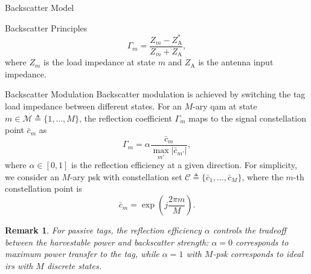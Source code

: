 \documentclass[journal]{IEEEtran}
\newtheorem{remark}{Remark}
\begin{document}
\begin{section}{Backscatter Model}
\begin{subsection}{Backscatter Principles}
			\begin{equation}
				\Gamma_m = \frac{Z_m - Z_{\mathrm{A}}^*}{Z_m + Z_{\mathrm{A}}},
				\label{eq:reflection_coefficient}
			\end{equation}
			where $Z_m$ is the load impedance at state $m$ and $Z_{\mathrm{A}}$ is the antenna input impedance.
		\end{subsection}

		\begin{subsection}{Backscatter Modulation}
			Backscatter modulation is achieved by switching the tag load impedance between different states. For an $M$-ary \gls{qam} at state $m \in \mathcal{M} \triangleq \{1,\ldots,M\}$, the reflection coefficient $\Gamma_m$ maps to the signal constellation point $\bar{c}_m$ as \cite{Thomas2012a}
			\begin{equation}
				\Gamma_m = \alpha \frac{\bar{c}_m}{\max_{m'} \lvert \bar{c}_{m'} \rvert},
				\label{eq:backscatter_modulation}
			\end{equation}
			where $\alpha \in [0,1]$ is the reflection efficiency at a given direction. For simplicity, we consider an $M$-ary \gls{psk} with constellation set $\mathcal{C} \triangleq \{\bar{c}_1,\ldots,\bar{c}_M\}$, where the $m$-th constellation point is
			\begin{equation}
				\bar{c}_m = \exp \left(j \frac{2 \pi m}{M}\right).
				\label{eq:mpsk}
			\end{equation}

			\begin{remark}
				For passive tags, the reflection efficiency $\alpha$ controls the tradeoff between the harvestable power and backscatter strength: $\alpha = 0$ corresponds to maximum power transfer to the tag, while $\alpha = 1$ with $M$-\gls{psk} corresponds to ideal \gls{irs} with $M$ discrete states.
			\end{remark}
		\end{subsection}
	\end{section}
\end{document}
